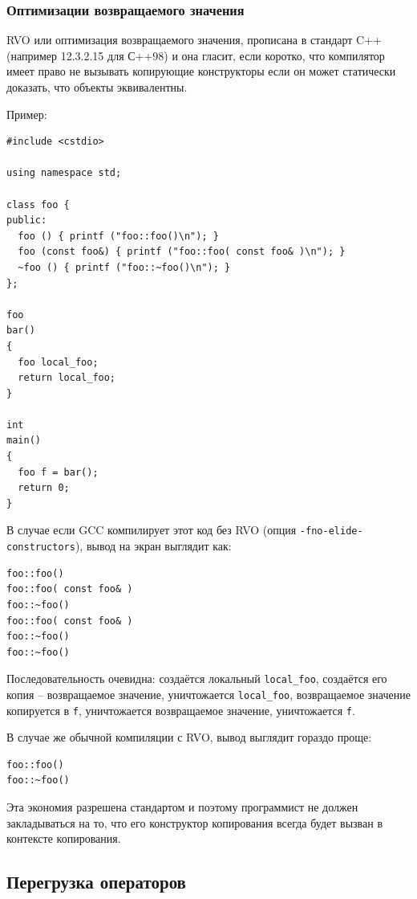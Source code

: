 \documentclass[a4paper,12pt,oneside]{article}
\begin{document}
\subsubsection{Оптимизации возвращаемого значения}\label{RVO}

RVO или оптимизация возвращаемого значения, прописана в стандарт C++ (например 12.3.2.15 для С++98) и она гласит, если коротко, что компилятор имеет право не вызывать копирующие конструкторы если он может статически доказать, что объекты эквивалентны.

Пример:

\begin{lstlisting}
#include <cstdio>

using namespace std;

class foo {
public:
  foo () { printf ("foo::foo()\n"); }
  foo (const foo&) { printf ("foo::foo( const foo& )\n"); }
  ~foo () { printf ("foo::~foo()\n"); }
};

foo
bar()
{
  foo local_foo;
  return local_foo;
}

int
main()
{
  foo f = bar();
  return 0;
}
\end{lstlisting}

В случае если GCC компилирует этот код без RVO (опция \lstinline!-fno-elide-constructors!), вывод на экран выглядит как:

\begin{lstlisting}
foo::foo()
foo::foo( const foo& )
foo::~foo()
foo::foo( const foo& )
foo::~foo()
foo::~foo()
\end{lstlisting}

Последовательность очевидна: создаётся локальный \lstinline!local_foo!, создаётся его копия -- возвращаемое значение, уничтожается \lstinline!local_foo!, возвращаемое значение копируется в \lstinline!f!, уничтожается возвращаемое значение, уничтожается \lstinline!f!.

В случае же обычной компиляции с RVO, вывод выглядит гораздо проще:

\begin{lstlisting}
foo::foo()
foo::~foo()
\end{lstlisting}

Эта экономия разрешена стандартом и поэтому программист не должен закладываться на то, что его конструктор копирования всегда будет вызван в контексте копирования.

\pagebreak
\subsection{Перегрузка операторов}\label{OperatorOverloading}
\end{document}
